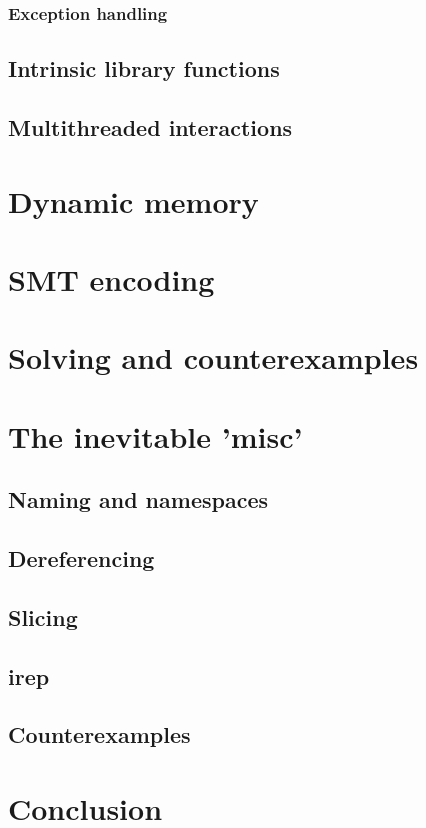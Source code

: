 \documentclass{article}
\begin{document}
\subsubsection{Exception handling}
\subsection{Intrinsic library functions}
\subsection{Multithreaded interactions}

\section{Dynamic memory}
\section{SMT encoding}
\section{Solving and counterexamples}
\section{The inevitable 'misc'}
\subsection{Naming and namespaces}
\subsection{Dereferencing}
\subsection{Slicing}
\subsection{irep}
\subsection{Counterexamples}
\section{Conclusion}
\end{document}
